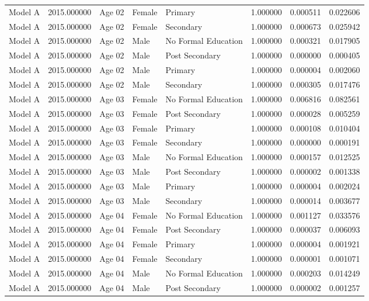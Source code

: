 \begin{table}[ht]
\begin{tabular}{lrlllrrr}
Model A & 2015.000000 & Age 02 & Female & Primary & 1.000000 & 0.000511 & 0.022606 \\
Model A & 2015.000000 & Age 02 & Female & Secondary & 1.000000 & 0.000673 & 0.025942 \\
Model A & 2015.000000 & Age 02 & Male & No Formal Education & 1.000000 & 0.000321 & 0.017905 \\
Model A & 2015.000000 & Age 02 & Male & Post Secondary & 1.000000 & 0.000000 & 0.000405 \\
Model A & 2015.000000 & Age 02 & Male & Primary & 1.000000 & 0.000004 & 0.002060 \\
Model A & 2015.000000 & Age 02 & Male & Secondary & 1.000000 & 0.000305 & 0.017476 \\
Model A & 2015.000000 & Age 03 & Female & No Formal Education & 1.000000 & 0.006816 & 0.082561 \\
Model A & 2015.000000 & Age 03 & Female & Post Secondary & 1.000000 & 0.000028 & 0.005259 \\
Model A & 2015.000000 & Age 03 & Female & Primary & 1.000000 & 0.000108 & 0.010404 \\
Model A & 2015.000000 & Age 03 & Female & Secondary & 1.000000 & 0.000000 & 0.000191 \\
Model A & 2015.000000 & Age 03 & Male & No Formal Education & 1.000000 & 0.000157 & 0.012525 \\
Model A & 2015.000000 & Age 03 & Male & Post Secondary & 1.000000 & 0.000002 & 0.001338 \\
Model A & 2015.000000 & Age 03 & Male & Primary & 1.000000 & 0.000004 & 0.002024 \\
Model A & 2015.000000 & Age 03 & Male & Secondary & 1.000000 & 0.000014 & 0.003677 \\
Model A & 2015.000000 & Age 04 & Female & No Formal Education & 1.000000 & 0.001127 & 0.033576 \\
Model A & 2015.000000 & Age 04 & Female & Post Secondary & 1.000000 & 0.000037 & 0.006093 \\
Model A & 2015.000000 & Age 04 & Female & Primary & 1.000000 & 0.000004 & 0.001921 \\
Model A & 2015.000000 & Age 04 & Female & Secondary & 1.000000 & 0.000001 & 0.001071 \\
Model A & 2015.000000 & Age 04 & Male & No Formal Education & 1.000000 & 0.000203 & 0.014249 \\
Model A & 2015.000000 & Age 04 & Male & Post Secondary & 1.000000 & 0.000002 & 0.001257 \\

\end{tabular}
\end{table}
